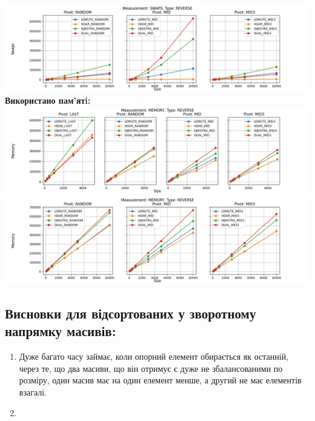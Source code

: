 \documentclass{article}
\begin{document}
        \includegraphics[scale=0.5]{reverse_Swaps_3_pivots_7_numbers.png}
        \newline
    \newpage
    \textbf{Використано пам’ятi:}
    \newline
        \includegraphics[scale=0.5]{reverse_Memory_6_numbers.png}
        \includegraphics[scale=0.5]{reverse_Memory_3_pivots_7_numbers.png}
    \subsection{Висновки для відсортованих у зворотному напрямку масивів:}
    \begin{enumerate}
        \item Дуже багато часу займає, коли опорний елемент обирається як останній, через те, що два масиви, що він отримує є дуже не збалансованими по розміру, один масив має на один елемент менше, а другий не має елементів взагалі.
        \item 
    \end{enumerate}
    \newpage

\end{document}
